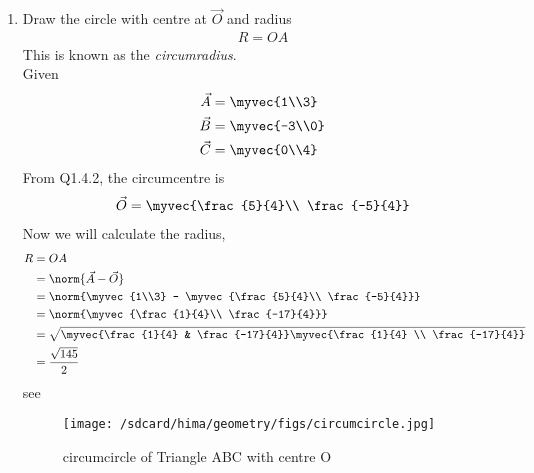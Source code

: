 \documentclass[11pt]{book}
\begin{document}
\begin{enumerate}[label=\thesection.\arabic*.,ref=\thesection.\theenumi]
\item Draw the circle with centre at $\vec{O}$ and radius 
\begin{align}
R = OA
\end{align}
This is known as the {\em circumradius}. \\
\solution
Given
\begin{align}
\vec{A} &= \myvec{1\\3}\\
\vec{B} &= \myvec{-3\\0}\\
\vec{C} &= \myvec{0\\4}
\end{align}
From Q1.4.2, the circumcentre is
\begin{align}
\vec{O} = \myvec{\frac{5}{4}\\ \frac{-5}{4}}
\end{align}
Now we will calculate the radius,
\begin{align}
      R &= OA\\
        &= \norm{\vec{A} - \vec{O}}\\
        &= \norm{\myvec{1\\3} - \myvec{\frac{5}{4}\\ \frac{-5}{4}}}\\
        &= \norm{\myvec{\frac{1}{4}\\ \frac{-17}{4}}}\\
        &=\sqrt{\myvec{\frac{1}{4} & \frac{-17}{4}}\myvec{\frac{1}{4} \\ \frac{-17}{4}}} \\
        &= \frac{\sqrt{145}}{2}
\end{align}
see 
\begin{figure}[H]
\centering
\texttt{[image: /sdcard/hima/geometry/figs/circumcircle.jpg]}
\caption{circumcircle of Triangle ABC with centre O}
\label{fig:circumcircle with centre O}	
\end{figure}


\end{enumerate}
\end{document}
